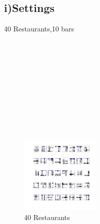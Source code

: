 \documentclass{article}
\begin{document}
\begin{spacing}{1.1}
\subsection{i)Settings}
40 Restaurants,10 bars\\ \\ \\ \\ \\ \\ \\ \\ \\ \\ \\
\begin{figure}
    \centering 
    \includegraphics[width=1.5in,height=1.5in]{restau.jpg} 
    \caption{40 Restaurants}
\end{figure}


\end{spacing}
\end{document}
